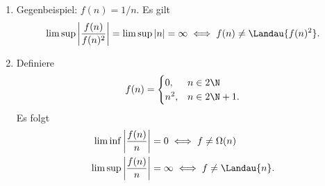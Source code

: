 \begin{solution}
\begin{enumerate}[label = (\alph*)]
  \item Gegenbeispiel: $f(n) = 1/n$. Es gilt
  \begin{align*}
    \limsup \left|\frac{f(n)}{f(n)^2}\right| = \limsup \left|n\right| = \infty \iff f(n) \neq \Landau{f(n)^2}.
  \end{align*}
  \item Definiere
  \begin{align*}
    f(n) = \begin{cases}
      0, & n \in 2\N \\
      n^2, & n \in 2\N + 1.
    \end{cases}
  \end{align*}
  Es folgt
  \begin{align*}
    \liminf \left|\frac{f(n)}{n}\right| &= 0 \iff f \neq \Omega(n) \\
    \limsup \left|\frac{f(n)}{n}\right| &= \infty \iff f \neq \Landau{n}.
  \end{align*}
\end{enumerate}

\end{solution}

